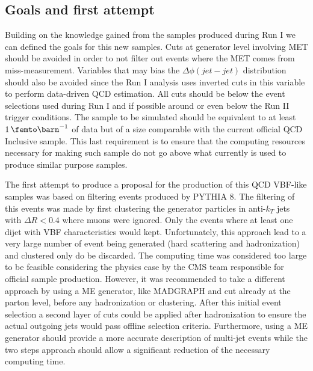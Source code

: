 \subsection{Goals and first attempt}
\label{SUBSECTION:RunIIPreparation_GoalsAndFirstAttempt}


Building on the knowledge gained from the samples produced during Run I we can defined the goals for this new samples. Cuts at generator level involving \gls{MET} should be avoided in order to not filter out events where the \gls{MET} comes from miss-measurement. Variables that may bias the $\Delta\phi(jet-jet)$ distribution should also be avoided since the Run I analysis uses inverted cuts in this variable to perform data-driven \gls{QCD} estimation. All cuts should be below the event selections used during Run I and if possible around or even below the Run II trigger conditions. The sample to be simulated should be equivalent to at least $1\,\femto\barn^{-1}$ of data but of a size comparable with the current official \gls{QCD} Inclusive sample. This last requirement is to ensure that the computing resources necessary for making such sample do not go above what currently is used to produce similar purpose samples. 

The first attempt to produce a proposal for the production of this \gls{QCD} \gls{VBF}-like samples was based on filtering events produced by \textsc{PYTHIA 8}. The filtering of this events was made by first clustering the generator particles in anti-$k_T$ jets with $\Delta R<0.4$ where muons were ignored. Only the events where at least one dijet with \gls{VBF} characteristics would kept. Unfortunately, this approach lead to a very large number of event being generated (hard scattering and hadronization) and clustered only do be discarded. The computing time was considered too large to be feasible considering the physics case by the \gls{CMS} team responsible for official sample production. However, it was recommended to take a different approach by using a \gls{ME} generator, like \textsc{MADGRAPH} and cut already at the parton level, before any hadronization or clustering. After this initial event selection a second layer of cuts could be applied after hadronization to ensure the actual outgoing jets would pass offline selection criteria. Furthermore, using a \gls{ME} generator should provide a more accurate description of multi-jet events while the two steps approach should allow a significant reduction of the necessary computing time. 

